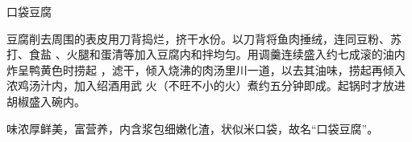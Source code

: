 \begin{recipe}{口袋豆腐}

\ingredients


\preparation

豆腐削去周围的表皮用刀背捣烂，挤干水份。以刀背将鱼肉捶绒，连同豆粉、苏打、食盐
、火腿和蛋清等加入豆腐内和拌均匀。用调羹连续盛入约七成滚的油内炸呈鸭黄色时捞起
，滤干，倾入烧沸的肉汤里川一道，以去其油味，捞起再倾入浓鸡汤汁内，加入绍酒用武
火（不旺不小的火）煮约五分钟即成。起锅时才放进胡椒盛入碗内。

\features

味浓厚鲜美，富营养，内含浆包细嫩化渣，状似米口袋，故名“口袋豆腐”。

\end{recipe}

